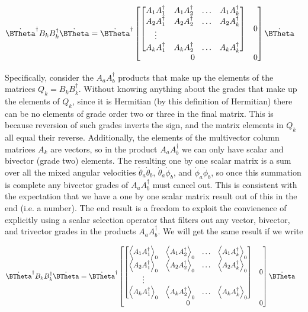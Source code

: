 \begin{align}\label{eqn:multiPendulumSpherical2:boo8}
\dot{\BTheta}^\dagger
B_k B_k^\dagger
\dot{\BTheta}
&=
\dot{\BTheta}^\dagger
\begin{bmatrix}
\begin{bmatrix}
A_1 A_1^\dagger & A_1 A_2^\dagger & \hdots & A_1 A_k^\dagger \\
A_2 A_1^\dagger & A_2 A_2^\dagger & \hdots & A_2 A_k^\dagger \\
\vdots \\
A_k A_1^\dagger & A_k A_2^\dagger & \hdots & A_k A_k^\dagger
\end{bmatrix} & 0 \\
0 & 0
\end{bmatrix}
\dot{\BTheta}
\end{align}

Specifically, consider the $A_a A_b^\dagger$ products that make up the elements of the matrices $Q_k = B_k B_k^\dagger$.  Without knowing anything about the grades that make up the elements of $Q_k$, since it is Hermitian (by this definition of Hermitian) there can be no elements of grade order two or three in the final matrix.  This is because reversion of such grades inverts the sign, and the matrix elements in $Q_k$ all equal their reverse.  Additionally, the elements of the multivector column matrices $A_k$ are vectors, so in the product $A_a A_b^\dagger$ we can only have scalar and bivector (grade two) elements.  The resulting one by one scalar matrix is a sum over all the mixed angular velocities $\dot{\theta}_a \dot{\theta}_b$, $\dot{\theta}_a \dot{\phi}_b$, and $\dot{\phi}_a \dot{\phi}_b$, so once this summation is complete any bivector grades of $A_a A_b^\dagger$ must cancel out.  This is consistent with the expectation that we have a one by one scalar matrix result out of this in the end (i.e. a number).  The end result is a freedom to exploit the convienence of explicitly using a scalar selection operator that filters out any vector, bivector, and trivector grades in the products $A_a A_b^\dagger$.  We will get the same result if we write

\begin{align}\label{eqn:multiPendulumSpherical2:boo9}
\dot{\BTheta}^\dagger
B_k B_k^\dagger
\dot{\BTheta}
&=
\dot{\BTheta}^\dagger
\begin{bmatrix}
\begin{bmatrix}
\gpgradezero{A_1 A_1^\dagger} & \gpgradezero{A_1 A_2^\dagger} & \hdots & \gpgradezero{A_1 A_k^\dagger} \\
\gpgradezero{A_2 A_1^\dagger} & \gpgradezero{A_2 A_2^\dagger} & \hdots & \gpgradezero{A_2 A_k^\dagger} \\
\vdots \\
\gpgradezero{A_k A_1^\dagger} & \gpgradezero{A_k A_2^\dagger} & \hdots & \gpgradezero{A_k A_k^\dagger}
\end{bmatrix} & 0 \\
0 & 0
\end{bmatrix}
\dot{\BTheta}
\end{align}

